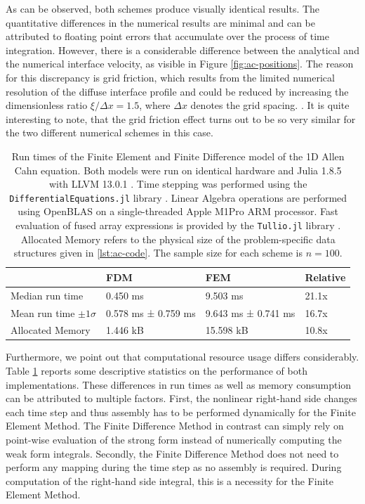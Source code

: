 \documentclass[asi,article,submit,moreauthors]{Definitions/mdpi}
\begin{document}
As can be observed, both schemes produce visually identical results.
The quantitative differences in the numerical results are minimal and can be attributed to floating point errors that accumulate over the process of time integration.
However, there is a considerable difference between the analytical and the numerical interface velocity, as visible in Figure \ref{fig:ac-positions}.
The reason for this discrepancy is grid friction, which results from the limited numerical resolution of the diffuse interface profile and could be reduced by increasing the dimensionless ratio $\xi /\Delta x = 1.5$, where $\Delta x$ denotes the grid spacing. \cite{fleckSharpPhasefieldModeling2023,fleckFrictionlessMotionDiffuse2022}. 
It is quite interesting to note, that the grid friction effect turns out to be so very similar for the two different numerical schemes in this case.

\begin{table}
\centering
\caption{Run times of the Finite Element and Finite Difference model of the 1D Allen Cahn equation. Both models were run on identical hardware and Julia 1.8.5 with LLVM 13.0.1 \cite{bezansonJuliaFreshApproach2017}. Time stepping was performed using the \texttt{DifferentialEquations.jl} library \cite{rackauckasDifferentialequationsJlPerformant2017}. Linear Algebra operations are performed using OpenBLAS \cite{wangAUGEMAutomaticallyGenerate2013,xianyiModeldriven} on a single-threaded Apple M1Pro ARM processor. Fast evaluation of fused array expressions is provided by the \texttt{Tullio.jl} library \cite{abbottMcabbottTullioJl2022}. Allocated Memory refers to the physical size of the problem-specific data structures given in \ref{lst:ac-code}. The sample size for each scheme is $n=100$.}
\label{tab:ac-performance}
\begin{tabular}{llll} 
    \toprule
    & \textbf{FDM} & \textbf{FEM}  & \textbf{Relative}  \\
    \midrule
Median run time             & 0.450 ms           & 9.503 ms             & 21.1x    \\
Mean run time $\pm 1\sigma$ & 0.578 ms ± 0.759 ms & 9.643 ms ±  0.741 ms & 16.7x    \\
Allocated Memory            & 1.446 kB            & 15.598 kB             & 10.8x  \\
\bottomrule
\end{tabular}
\end{table}

Furthermore, we point out that computational resource usage differs considerably. 
Table \ref{tab:ac-performance} reports some descriptive statistics on the performance of both implementations.
These differences in run times as well as memory consumption can be attributed to multiple factors.
First, the nonlinear right-hand side changes each time step and thus assembly has to be performed dynamically for the Finite Element Method. The Finite Difference Method in contrast can simply rely on point-wise evaluation of the strong form instead of numerically computing the weak form integrals.
Secondly, the Finite Difference Method does not need to perform any mapping during the time step as no assembly is required. During computation of the right-hand side integral, this is a necessity for the Finite Element Method.
\end{document}
